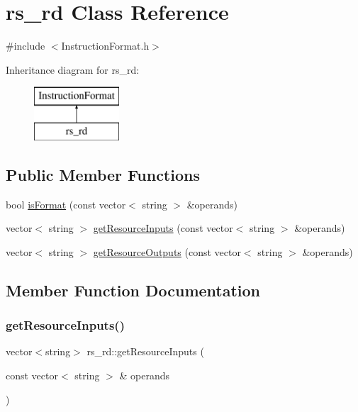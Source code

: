 \hypertarget{classrs__rd}{}\section{rs\+\_\+rd Class Reference}
\label{classrs__rd}


{\ttfamily \#include $<$Instruction\+Format.\+h$>$}

Inheritance diagram for rs\+\_\+rd\+:\begin{figure}[H]
\begin{center}
\leavevmode
\includegraphics[height=2.000000cm]{classrs__rd}
\end{center}
\end{figure}
\subsection*{Public Member Functions}
\begin{DoxyCompactItemize}
\item 
bool \hyperlink{classrs__rd_a982dd920345cfe325ee486e099640359}{is\+Format} (const vector$<$ string $>$ \&operands)
\item 
vector$<$ string $>$ \hyperlink{classrs__rd_aae3990a01a4cc7cb32f4c1f32fffc8ac}{get\+Resource\+Inputs} (const vector$<$ string $>$ \&operands)
\item 
vector$<$ string $>$ \hyperlink{classrs__rd_aeb39c1906a9ccd080b21dda0f711b6ed}{get\+Resource\+Outputs} (const vector$<$ string $>$ \&operands)
\end{DoxyCompactItemize}


\subsection{Member Function Documentation}
\mbox{\label{classrs__rd_aae3990a01a4cc7cb32f4c1f32fffc8ac}} 
\subsubsection{\texorpdfstring{get\+Resource\+Inputs()}{getResourceInputs()}}
{\footnotesize\ttfamily vector$<$string$>$ rs\+\_\+rd\+::get\+Resource\+Inputs (\begin{DoxyParamCaption}\item[{const vector$<$ string $>$ \&}]{operands }\end{DoxyParamCaption})\hspace{0.3cm}{\ttfamily [virtual]}}

